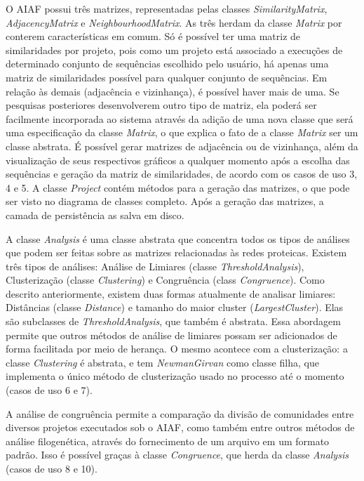O AIAF possui três matrizes, representadas pelas classes \textit{SimilarityMatrix}, \textit{AdjacencyMatrix} e \textit{NeighbourhoodMatrix}. As três herdam
da classe \textit{Matrix} por conterem características em comum. Só é possível ter uma matriz de similaridades por projeto, pois como um projeto está associado
a execuções de determinado conjunto de sequências escolhido pelo usuário, há apenas uma matriz de similaridades possível para qualquer conjunto de sequências.
Em relação às demais (adjacência e vizinhança), é possível haver mais de uma. Se pesquisas posteriores desenvolverem outro tipo de matriz, ela poderá ser
facilmente incorporada ao sistema através da adição de uma nova classe que será uma especificação da classe \textit{Matrix}, o que explica o fato de a classe
\textit{Matrix} ser um classe abstrata. É possível gerar matrizes de adjacência ou de vizinhança, além da visualização de seus respectivos gráficos a qualquer
momento após a escolha das sequências e geração da matriz de similaridades, de acordo com os casos de uso 3, 4 e 5. A classe \textit{Project} contém métodos
para a geração das matrizes, o que pode ser visto no diagrama de classes completo. Após a geração das matrizes, a camada de persistência as salva em disco.

A classe \textit{Analysis} é uma classe abstrata que concentra todos os tipos de análises que podem ser feitas sobre as matrizes relacionadas às redes
proteicas. Existem três tipos de análises: Análise de Limiares (classe \textit{ThresholdAnalysis}), Clusterização (classe \textit{Clustering}) e
Congruência (class \textit{Congruence}). Como descrito anteriormente, existem duas formas atualmente de analisar limiares: Distâncias (classe
\textit{Distance}) e tamanho do maior cluster (\textit{LargestCluster}). Elas são subclasses de \textit{ThresholdAnalysis}, que também é abstrata. Essa
abordagem permite que outros métodos de análise de limiares possam ser adicionados de forma facilitada por meio de herança. O mesmo acontece com a
clusterização: a classe \textit{Clustering} é abstrata, e tem \textit{NewmanGirvan} como classe filha, que implementa o único método de clusterização
usado no processo até o momento (casos de uso 6 e 7).

A análise de congruência permite a comparação da divisão de comunidades entre diversos projetos executados sob o AIAF, como também entre outros métodos de
análise filogenética, através do fornecimento de um arquivo em um formato padrão. Isso é possível graças à classe \textit{Congruence}, que herda da classe
\textit{Analysis} (casos de uso 8 e 10).


